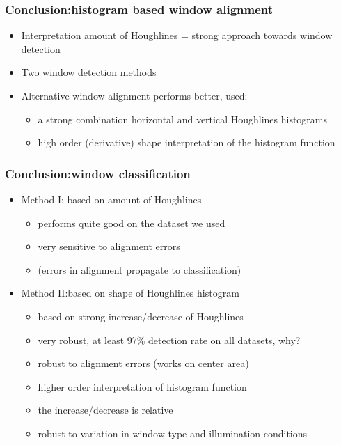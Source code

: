 \documentclass{beamer}
\begin{document}
\frame
{
	\frametitle{Conclusion:histogram based window alignment}		

	\begin{itemize}
	\item <+-| alert@+> Interpretation amount of Houghlines = strong approach towards window
	detection
	\item <+-| alert@+> Two window detection methods
	\item <+-| alert@+> Alternative window alignment performs better, used:
		\begin{itemize}
		\item <+-| alert@+> a strong combination horizontal and vertical Houghlines histograms
		\item <+-| alert@+> high order (derivative) shape interpretation of the histogram function
		\end{itemize}
	\end{itemize}

}
\frame
{
	\frametitle{Conclusion:window classification}		
	\begin{itemize}
	\item <+-| alert@+> Method I: based on amount of Houghlines
		\begin{itemize}
		\item <+-| alert@+> performs quite good on the dataset we used
		\item <+-| alert@+> very sensitive to alignment errors
		\item <+-| alert@+> (errors in alignment propagate to classification)
		\end{itemize}
	\item <+-| alert@+> Method II:based on shape of Houghlines histogram
		\begin{itemize}
		\item <+-| alert@+> based on strong increase/decrease of Houghlines
		\item <+-| alert@+> very robust, at least 97\% detection rate on all datasets, why?
		\item <+-| alert@+> robust to alignment errors (works on center area)
		\item <+-| alert@+> higher order interpretation of histogram function
		\item <+-| alert@+> the increase/decrease is relative
		\item <+-| alert@+> robust to variation in window type and illumination conditions
		\end{itemize}
	\end{itemize}
}
\end{document}
